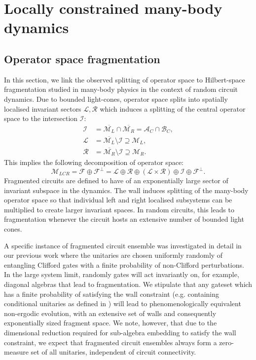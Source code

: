 \documentclass[11pt, twocolumn, floatfix, superscriptaddress, aps, prb, raggedbottom]{revtex4-2}
\begin{document}
\section{Locally constrained many-body dynamics  \label{sec:dynamical_features}}


\subsection{Operator space fragmentation}

In this section, we link the observed splitting of operator space to Hilbert-space fragmentation studied in many-body physics \cite{Moudgalya2022} in the context of random circuit dynamics. 
Due to bounded light-cones, operator space splits into spatially localised invariant sectors $\mathcal{L}, \mathcal{R}$ which induces a splitting of the central operator space to the intersection $\mathcal{I}$:
\begin{align}
    \mathcal{I} &= \overline{\mathcal{M}_L} \cap \overline{\mathcal{M}_R} =\mathcal{A}_C \cap \mathcal{B}_C, 
    \\
    \mathcal{L} &= \overline{\mathcal{M}_L}\setminus \mathcal{I} \supseteq \mathcal{M}_L, \\
    \mathcal{R} &= \overline{\mathcal{M}_R} \setminus \mathcal{I} \supseteq \mathcal{M}_R.
\end{align}
\noindent This implies the following decomposition of operator space:
\begin{equation}
    \mathcal{M}_{LCR} = \mathcal{F} \oplus \mathcal{F}^{\perp} = \mathcal{L} \oplus \mathcal{R} \oplus \left (\mathcal{L} \times \mathcal{R}\right) \oplus \mathcal{I} \oplus \mathcal{F}^{\perp}.
\end{equation}
\noindent  Fragmented circuits are defined to have of an exponentially large sector of invariant subspace in the dynamics. The wall induces splitting of the many-body operator space so that individual left and right localised subsystems can be multiplied to create larger invariant spaces. In random circuits, this leads to fragmentation whenever the circuit hosts an extensive number of bounded light cones.

A specific instance of fragmented circuit ensemble was investigated in detail in our previous work \cite{Kovacs2026} where the unitaries are chosen uniformly randomly of entangling Clifford gates with a finite probability of non-Clifford perturbations. In the large system limit, randomly gates will act invariantly on, for example, diagonal algebras that lead to fragmentation. We stipulate that any gateset which has a finite probability of satisfying the wall constraint (e.g. containing conditional unitaries as defined in ) will lead to phenomenologically equivalent non-ergodic evolution, with an extensive set of walls and consequently exponentially sized fragment space. We note, however, that due to the dimensional reduction required for sub-algebra embedding to satisfy the wall constraint, we expect that fragmented circuit ensembles always form a zero-measure set of all unitaries, independent of circuit connectivity.  
\end{document}
